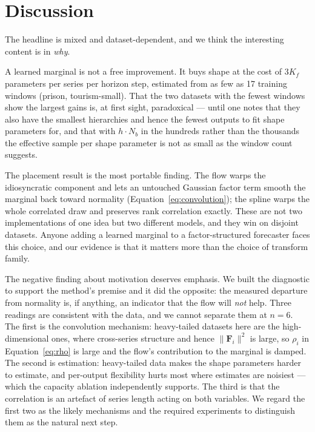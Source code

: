 \documentclass[11pt]{article}
\newcommand{\Nb}{N_{b}}
\newcommand{\Fmat}{\mathbf{F}}
\begin{document}
\section{Discussion}

The headline is mixed and dataset-dependent, and we think the interesting content is
in \emph{why}.

A learned marginal is not a free improvement. It buys shape at the cost of
$3K_f$ parameters per series per horizon step, estimated from as few as 17 training
windows (prison, tourism-small). That the two datasets with the fewest windows show
the largest gains is, at first sight, paradoxical --- until one notes that they also
have the smallest hierarchies and hence the fewest outputs to fit shape parameters
for, and that with $h \cdot \Nb$ in the hundreds rather than the thousands the
effective sample per shape parameter is not as small as the window count suggests.

The placement result is the most portable finding. The flow warps the idiosyncratic
component and lets an untouched Gaussian factor term smooth the marginal back toward
normality (Equation~\eqref{eq:convolution}); the spline warps the whole correlated
draw and preserves rank correlation exactly. These are not two implementations of one
idea but two different models, and they win on disjoint datasets. Anyone adding a
learned marginal to a factor-structured forecaster faces this choice, and our
evidence is that it matters more than the choice of transform family.

The negative finding about motivation deserves emphasis. We built the diagnostic to
support the method's premise and it did the opposite: the measured departure from
normality is, if anything, an indicator that the flow will \emph{not} help. Three
readings are consistent with the data, and we cannot separate them at $n=6$. The
first is the convolution mechanism: heavy-tailed datasets here are the
high-dimensional ones, where cross-series structure and hence $\|\Fmat_i\|^2$ is
large, so $\rho_i$ in Equation~\eqref{eq:rho} is large and the flow's contribution to
the marginal is damped. The second is estimation: heavy-tailed data makes the shape
parameters harder to estimate, and per-output flexibility hurts most where estimates
are noisiest --- which the capacity ablation independently supports. The third is
that the correlation is an artefact of series length acting on both variables. We
regard the first two as the likely mechanisms and the required experiments to
distinguish them as the natural next step.
\end{document}
